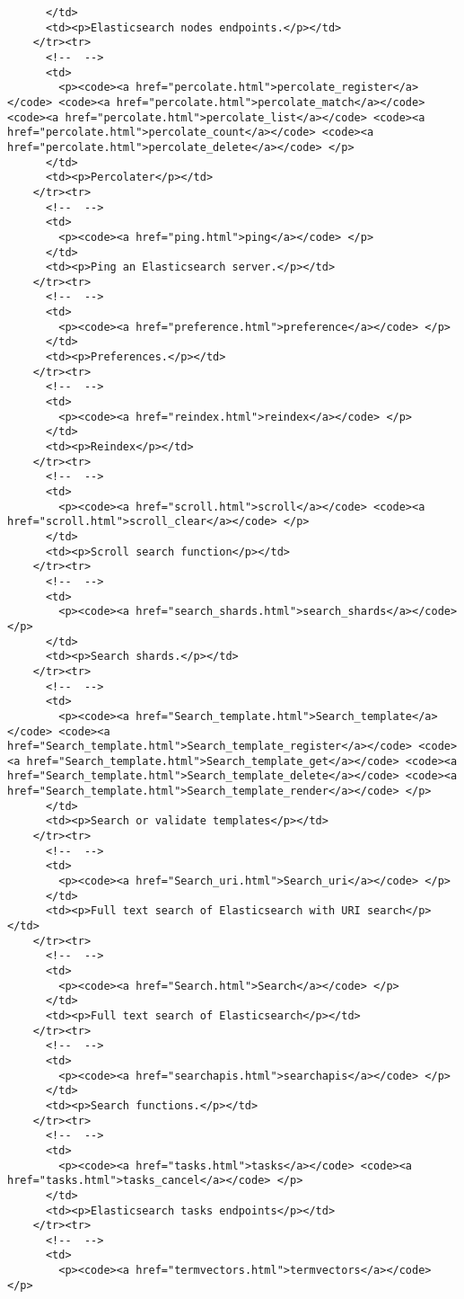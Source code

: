 \documentclass[]{article}
\begin{document}
\begin{verbatim}
      </td>
      <td><p>Elasticsearch nodes endpoints.</p></td>
    </tr><tr>
      <!--  -->
      <td>
        <p><code><a href="percolate.html">percolate_register</a></code> <code><a href="percolate.html">percolate_match</a></code> <code><a href="percolate.html">percolate_list</a></code> <code><a href="percolate.html">percolate_count</a></code> <code><a href="percolate.html">percolate_delete</a></code> </p>
      </td>
      <td><p>Percolater</p></td>
    </tr><tr>
      <!--  -->
      <td>
        <p><code><a href="ping.html">ping</a></code> </p>
      </td>
      <td><p>Ping an Elasticsearch server.</p></td>
    </tr><tr>
      <!--  -->
      <td>
        <p><code><a href="preference.html">preference</a></code> </p>
      </td>
      <td><p>Preferences.</p></td>
    </tr><tr>
      <!--  -->
      <td>
        <p><code><a href="reindex.html">reindex</a></code> </p>
      </td>
      <td><p>Reindex</p></td>
    </tr><tr>
      <!--  -->
      <td>
        <p><code><a href="scroll.html">scroll</a></code> <code><a href="scroll.html">scroll_clear</a></code> </p>
      </td>
      <td><p>Scroll search function</p></td>
    </tr><tr>
      <!--  -->
      <td>
        <p><code><a href="search_shards.html">search_shards</a></code> </p>
      </td>
      <td><p>Search shards.</p></td>
    </tr><tr>
      <!--  -->
      <td>
        <p><code><a href="Search_template.html">Search_template</a></code> <code><a href="Search_template.html">Search_template_register</a></code> <code><a href="Search_template.html">Search_template_get</a></code> <code><a href="Search_template.html">Search_template_delete</a></code> <code><a href="Search_template.html">Search_template_render</a></code> </p>
      </td>
      <td><p>Search or validate templates</p></td>
    </tr><tr>
      <!--  -->
      <td>
        <p><code><a href="Search_uri.html">Search_uri</a></code> </p>
      </td>
      <td><p>Full text search of Elasticsearch with URI search</p></td>
    </tr><tr>
      <!--  -->
      <td>
        <p><code><a href="Search.html">Search</a></code> </p>
      </td>
      <td><p>Full text search of Elasticsearch</p></td>
    </tr><tr>
      <!--  -->
      <td>
        <p><code><a href="searchapis.html">searchapis</a></code> </p>
      </td>
      <td><p>Search functions.</p></td>
    </tr><tr>
      <!--  -->
      <td>
        <p><code><a href="tasks.html">tasks</a></code> <code><a href="tasks.html">tasks_cancel</a></code> </p>
      </td>
      <td><p>Elasticsearch tasks endpoints</p></td>
    </tr><tr>
      <!--  -->
      <td>
        <p><code><a href="termvectors.html">termvectors</a></code> </p>

\end{verbatim}
\end{document}
